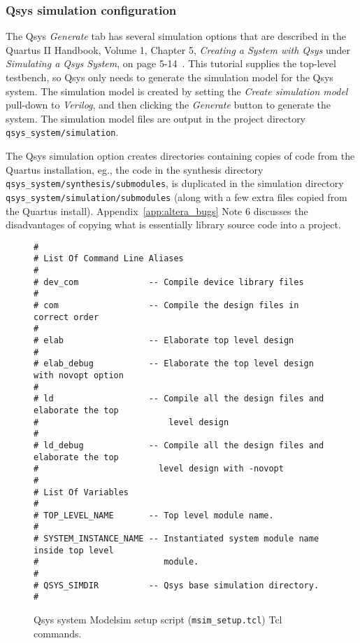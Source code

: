 \documentclass[10pt,twoside]{article}
\begin{document}
\subsubsection{Qsys simulation configuration}

The Qsys {\em Generate} tab has several simulation options that
are described in the Quartus II Handbook, Volume 1, Chapter 5,
{\em Creating a System with Qsys} under {\em Simulating a Qsys
System}, on page 5-14~\cite{Altera_Quartus_Handbook_2011}.
This tutorial supplies the top-level testbench, so Qsys only
needs to generate the simulation model for the Qsys
system. The simulation model is created by setting the 
{\em Create simulation model} pull-down to {\em Verilog},
and then clicking the {\em Generate} button to generate
the system. The simulation model files are output in the 
project directory \verb+qsys_system/simulation+. 

The Qsys simulation option creates directories containing copies
of code from the Quartus installation, eg., the code in
the synthesis directory \verb+qsys_system/synthesis/submodules+,
is duplicated in the simulation directory
\verb+qsys_system/simulation/submodules+ 
(along with a few extra files copied from the Quartus 
install). Appendix~\ref{app:altera_bugs} 
Note 6\label{bug:6b} discusses the disadvantages of 
copying what is essentially library source code into a project.

\begin{figure}[t]
\begin{center}
\begin{minipage}{\textwidth}
\begin{verbatim}
#
# List Of Command Line Aliases 
# 
# dev_com              -- Compile device library files 
# 
# com                  -- Compile the design files in correct order 
# 
# elab                 -- Elaborate top level design 
# 
# elab_debug           -- Elaborate the top level design with novopt option 
# 
# ld                   -- Compile all the design files and elaborate the top
#                          level design 
# 
# ld_debug             -- Compile all the design files and elaborate the top
#                        level design with -novopt 
# 
# List Of Variables 
# 
# TOP_LEVEL_NAME       -- Top level module name. 
# 
# SYSTEM_INSTANCE_NAME -- Instantiated system module name inside top level
#                         module. 
# 
# QSYS_SIMDIR          -- Qsys base simulation directory. 
#
\end{verbatim}
\end{minipage}
\end{center}
  \caption{Qsys system Modelsim setup script ({\tt msim\_setup.tcl}) Tcl commands.}
  \label{fig:qsys_system_msim_setup}
\end{figure}
\end{document}
